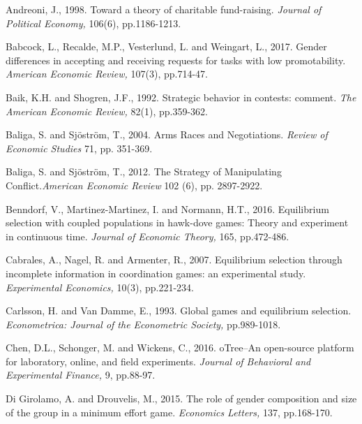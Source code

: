 \documentclass[12pt,english]{article}
\begin{document}
\newpage
\begin{thebibliography}{10}

\bibitem{} Andreoni, J., 1998. Toward a theory of charitable fund-raising. \textit{Journal of Political Economy,} 106(6), pp.1186-1213.

\bibitem{} Babcock, L., Recalde, M.P., Vesterlund, L. and Weingart, L., 2017. Gender differences in accepting and receiving requests for tasks with low promotability. \textit{American Economic Review,} 107(3), pp.714-47.

\bibitem{} Baik, K.H. and Shogren, J.F., 1992. Strategic behavior in contests: comment. \textit{The American Economic Review,} 82(1), pp.359-362.

  Baliga, S. and Sj\"ostr\"om, T., 2004. Arms Races and Negotiations. \textit{Review of Economic Studies} 71, pp. 351-369.





  Baliga, S. and Sj\"ostr\"om, T., 2012. The Strategy of Manipulating Conflict.\textit{American Economic Review} 102 (6), pp. 2897-2922.

 Benndorf, V., Martinez-Martinez, I. and Normann, H.T., 2016. Equilibrium selection with coupled populations in hawk-dove games: Theory and experiment in continuous time. \textit{Journal of Economic Theory,} 165, pp.472-486.

\bibitem{} Cabrales, A., Nagel, R. and Armenter, R., 2007. Equilibrium selection through incomplete information in coordination games: an experimental study. \textit{Experimental Economics,} 10(3), pp.221-234.

\bibitem{} Carlsson, H. and Van Damme, E., 1993. Global games and equilibrium selection. \textit{Econometrica: Journal of the Econometric Society,} pp.989-1018.

 Chen, D.L., Schonger, M. and Wickens, C., 2016. oTree--An open-source platform for laboratory, online, and field experiments. \textit{Journal of Behavioral and Experimental Finance,} 9, pp.88-97.

 Di Girolamo, A. and Drouvelis, M., 2015. The role of gender composition and size of the group in a minimum effort game. \textit{Economics Letters,} 137, pp.168-170.


\end{thebibliography}
\end{document}
